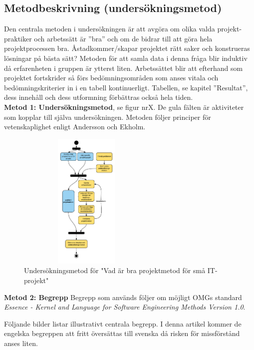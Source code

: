 \documentclass[conference]{IEEEtran}
\begin{document}
\subsection{Metodbeskrivning (undersökningsmetod)}
Den centrala metoden i undersökningen är att avgöra om olika valda projekt-praktiker 
och arbetssätt är ”bra” och om de bidrar till att göra hela projektprocessen bra. 
Åstadkommer/skapar projektet rätt saker och konstrueras lösningar på bästa sätt? 
Metoden för att samla data i denna fråga blir induktiv då erfarenheten i gruppen är 
ytterst liten. Arbetssättet blir att efterhand som projektet fortskrider så förs 
bedömningsområden som anses vitala och bedömningskriterier in i en tabell kontinuerligt. 
Tabellen, se kapitel ”Resultat”, dess innehåll och dess utformning förbättras också hela 
tiden.\\

\textbf{Metod 1: Undersökningsmetod}, se figur nrX. De gula fälten är aktiviteter som 
kopplar till själva undersökningen. Metoden följer principer för vetenskaplighet 
enligt Andersson och Ekholm.
 
\begin{figure}[htbp]
    \centerline{\includegraphics[max height=250px, max width=250px]{images/undersokningsmetod.png}}
    \caption{Undersökningsmetod för "Vad är bra projektmetod för små IT-projekt"}
    \label{fig}
\end{figure}

\textbf{Metod 2: Begrepp}
Begrepp som används följer om möjligt OMGs standard 
\textit{Essence - Kernel and Language for Software Engineering Methods Version 1.0}.

Följande bilder listar illustrativt centrala begrepp. I denna artikel kommer de engelska
begreppen att fritt översättas till svenska då risken för missförstånd anses liten.
\end{document}
